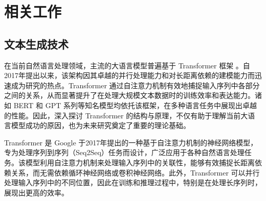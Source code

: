 

\chapter{相关工作}
\label{chap:related works}

\section{文本生成技术}
\label{sec:rw-lm}

在当前自然语言处理领域，主流的大语言模型普遍基于 Transformer 框架 \cite{transformer}。自2017年提出以来，该架构因其卓越的并行处理能力和对长距离依赖的建模能力而迅速成为研究的热点。Transformer 通过自注意力机制有效地捕捉输入序列中各部分之间的关系，从而显著提升了在处理大规模文本数据时的训练效率和表达能力。诸如 BERT 和 GPT 系列等知名模型均依托该框架，在多种语言任务中展现出卓越的性能。因此，深入探讨 Transformer 的结构与原理，不仅有助于理解当前大语言模型成功的原因，也为未来研究奠定了重要的理论基础。

Transformer 是 Google 于2017年提出的一种基于自注意力机制的神经网络模型，专为处理序列到序列（Seq2Seq）任务而设计，广泛应用于各种自然语言处理任务。该模型利用自注意力机制来处理输入序列中的关联性，能够有效捕捉长距离依赖关系，而无需依赖循环神经网络或卷积神经网络。此外，Transformer 可以并行处理输入序列中的不同位置，因此在训练和推理过程中，特别是在处理长序列时，展现出更高的效率。

